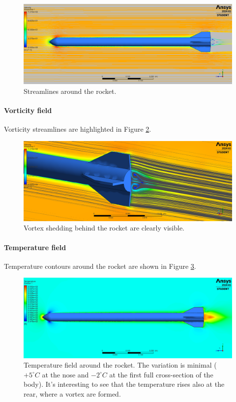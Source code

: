\begin{figure}[H]
    \centering
    \includegraphics[width=.8\textwidth]{img/Results/Streamline_lateral.png}
    \caption{Streamlines around the rocket.}
    \label{fig:streamline_lateral}
\end{figure}


\paragraph{Vorticity field}

Vorticity streamlines are highlighted in Figure \ref{fig:vorticity_field}.

\begin{figure}[H]
    \centering
    \includegraphics[width=.8\textwidth]{img/Results/Streamline_Fins.png}
    \caption{Vortex shedding behind the rocket are clearly visible.}
    \label{fig:vorticity_field}
\end{figure}


\paragraph{Temperature field}

Temperature contours around the rocket are shown in Figure \ref{fig:temperature_field}.

\begin{figure}[H]
    \centering
    \includegraphics[width=.8\textwidth]{img/Results/Coutours_Temperature.png}
    \caption{Temperature field around the rocket. The variation is minimal ($+5 ^\circ C$ at the nose and $-2 ^\circ C$ at the first full cross-section of the body). It's interesting to see that the temperature rises also at the rear, where a vortex are formed.}
    \label{fig:temperature_field}
\end{figure}